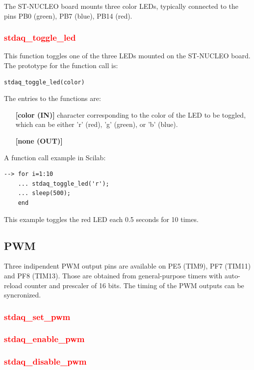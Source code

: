 \documentclass[letterpaper,10pt,english]{hitec}
\begin{document}
The ST-NUCLEO board mounts three color LEDs, typically connected to the pins PB0 (green), PB7 (blue), PB14 (red).

\subsubsection{\textcolor{red}{stdaq\_toggle\_led}}
This function toggles one of the three LEDs mounted on the ST-NUCLEO board.
The prototype for the function call is: 
\begin{verbatim}
stdaq_toggle_led(color)
\end{verbatim}
The entries to the functions are:
\begin{itemize}
\item [\textbf{[color (IN)]}] character corresponding to the color of the LED to be toggled, which can be either 'r' (red), 'g' (green), or 'b' (blue).
\item [\textbf{[none (OUT)]}]
\end{itemize}
A function call example in Scilab:
\begin{verbatim}
--> for i=1:10
    ... stdaq_toggle_led('r');
    ... sleep(500);
    end
\end{verbatim}
This example toggles the red LED each 0.5 seconds for 10 times.

\hrulefill

\subsection{PWM}

Three indipendent PWM output pins are available on PE5 (TIM9), PF7 (TIM11) and PF8 (TIM13).
Those are obtained from general-purpose timers with auto-reload counter and prescaler of 16 bits.
The timing of the PWM outputs can be syncronized.

\subsubsection{\textcolor{red}{stdaq\_set\_pwm}}

\subsubsection{\textcolor{red}{stdaq\_enable\_pwm}}

\subsubsection{\textcolor{red}{stdaq\_disable\_pwm}}
\end{document}
